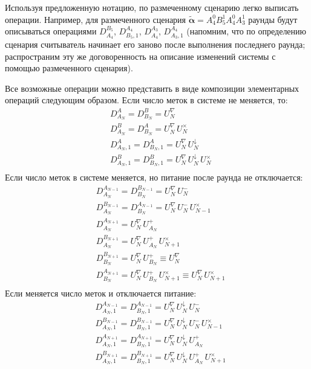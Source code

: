 Используя предложенную нотацию, по размеченному сценарию легко выписать операции. Например, для размеченного сценария $\widetilde{\bm{\alpha}} = A^0_4 B^1_5 A^0_4 A^1_3$ раунды будут описываться операциями $D_{A_4}^{B_5}$, $D_{B_5,1}^{A_4}$, $D_{A_4}^{A_3}$, $D_{A_3,1}^{A_4}$ (напомним, что по определению сценария считыватель начинает его заново после выполнения последнего раунда; распространим эту же договоренность на описание изменений системы с помощью размеченного сценария).

Все возможные операции можно представить в виде композиции элементарных операций следующим образом. Если число меток в системе не меняется, то:
\begin{equation}\label{eq:ch3_bg_ops_1}
	\begin{aligned}
		&D_{A_N}^{A}         = D_{B_N}^{B}         = U_N^\nabla\\
		&D_{A_N}^{B}         = D_{B_N}^{A}         = U_N^\nabla\, U_N^\times\\
		&D_{A_N,1}^{A}       = D_{B_N,1}^{A}       = U_N^\nabla\, U_N^\downarrow\\
		&D_{A_N,1}^{B}       = D_{B_N,1}^{B}       = U_N^\nabla\, U_N^\downarrow\, U_N^\times\\
	\end{aligned}
\end{equation}
Если число меток в системе меняется, но питание после раунда не отключается:
\begin{equation}\label{eq:ch3_bg_ops_2}
	\begin{aligned}
		&D_{A_N}^{A_{N-1}}   = D_{B_N}^{B_{N-1}}                        =      U_N^\nabla\, U_N^-\\
		&D_{A_N}^{B_{N-1}}   = D_{B_N}^{A_{N-1}}                        =      U_N^\nabla\, U_N^-\, U_{N-1}^\times\\
		&D_{A_N}^{A_{N+1}}   = U_N^\nabla\, U_{A_N}^+\\
		&D_{A_N}^{B_{N+1}}   = U_N^\nabla\, U_{A_N}^+\, U_{N+1}^\times\\
		&D_{B_N}^{B_{N+1}}   = U_N^\nabla\, U_{B_N}^+                   \equiv U_N^\nabla\\
		&D_{B_N}^{A_{N+1}}   = U_N^\nabla\, U_{B_N}^+\, U_{N+1}^\times  \equiv U_N^\nabla\, U_{N+1}^\times\\
	\end{aligned}
\end{equation}
Если меняется число меток и отключается питание:
\begin{equation}\label{eq:ch3_bg_ops_3}
	\begin{aligned}
		&D_{A_N,1}^{A_{N-1}} = D_{B_N,1}^{A_{N-1}} = U_N^\nabla\, U_N^\downarrow\, U_N^-\\
		&D_{A_N,1}^{B_{N-1}} = D_{B_N,1}^{B_{N-1}} = U_N^\nabla\, U_N^\downarrow\, U_N^-\, U_{N-1}^\times\\
		&D_{A_N,1}^{A_{N+1}} = D_{B_N,1}^{A_{N+1}} = U_N^\nabla\, U_N^\downarrow\, U_{A_N}^+\\
		&D_{A_N,1}^{B_{N+1}} = D_{B_N,1}^{B_{N+1}} = U_N^\nabla\, U_N^\downarrow\, U_{A_N}^+ \, U_{N+1}^\times
	\end{aligned}
\end{equation}

